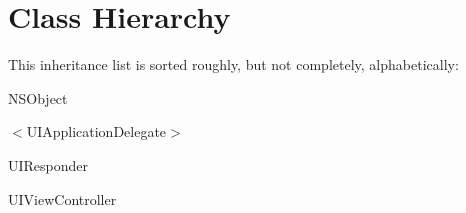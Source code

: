 \section{Class Hierarchy}
This inheritance list is sorted roughly, but not completely, alphabetically\+:\begin{DoxyCompactList}
\item {}
\begin{DoxyCompactList}
\item {}
\end{DoxyCompactList}
\item {}
\item N\+S\+Object\begin{DoxyCompactList}
\item {}
\end{DoxyCompactList}
\item $<$U\+I\+Application\+Delegate$>$\begin{DoxyCompactList}
\item {}
\end{DoxyCompactList}
\item U\+I\+Responder\begin{DoxyCompactList}
\item {}
\end{DoxyCompactList}
\item U\+I\+View\+Controller\begin{DoxyCompactList}
\item {}
\end{DoxyCompactList}
\item {}
\end{DoxyCompactList}
